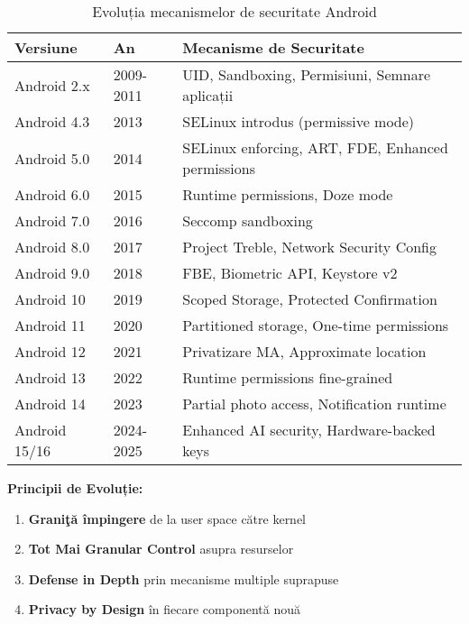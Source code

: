 \documentclass[11pt,a4paper,twocolumn]{article}
\theoremstyle{definition}
\theoremstyle{plain}
\theoremstyle{remark}
\begin{document}
\begin{table}[h]
    \centering
    \caption{Evoluția mecanismelor de securitate Android}
    \label{tab:security_evolution}
    \begin{tabular}{llp{6cm}}
        \toprule
        \textbf{Versiune} & \textbf{An} & \textbf{Mecanisme de Securitate} \\
        \midrule
        Android 2.x & 2009-2011 & UID, Sandboxing, Permisiuni, Semnare aplicații \\
        Android 4.3 & 2013 & SELinux introdus (permissive mode) \\
        Android 5.0 & 2014 & SELinux enforcing, ART, FDE, Enhanced permissions \\
        Android 6.0 & 2015 & Runtime permissions, Doze mode \\
        Android 7.0 & 2016 & Seccomp sandboxing \\
        Android 8.0 & 2017 & Project Treble, Network Security Config \\
        Android 9.0 & 2018 & FBE, Biometric API, Keystore v2 \\
        Android 10 & 2019 & Scoped Storage, Protected Confirmation \\
        Android 11 & 2020 & Partitioned storage, One-time permissions \\
        Android 12 & 2021 & Privatizare MA, Approximate location \\
        Android 13 & 2022 & Runtime permissions fine-grained \\
        Android 14 & 2023 & Partial photo access, Notification runtime \\
        Android 15/16 & 2024-2025 & Enhanced AI security, Hardware-backed keys \\
        \bottomrule
    \end{tabular}
\end{table}

\textbf{Principii de Evoluție:}
\begin{enumerate}
    \item \textbf{Graniţă împingere} de la user space către kernel
    \item \textbf{Tot Mai Granular Control} asupra resurselor
    \item \textbf{Defense in Depth} prin mecanisme multiple suprapuse
    \item \textbf{Privacy by Design} în fiecare componentă nouă
\end{enumerate}
\end{document}
